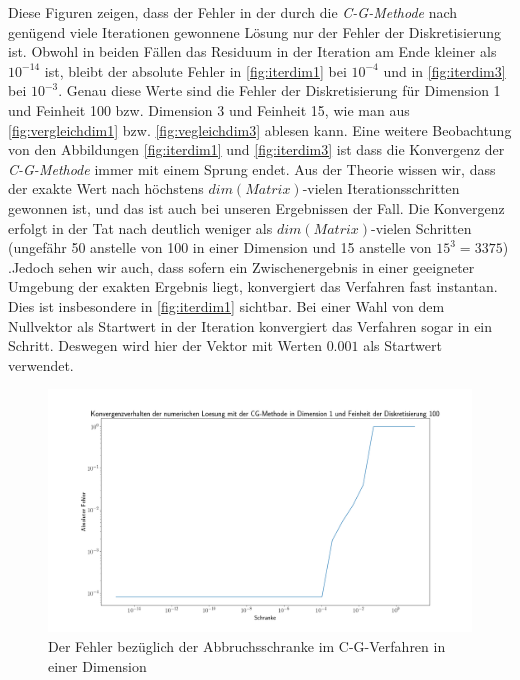 \documentclass[smallheadings]{scrartcl}
\numberwithin{equation}{section}
\begin{document}
 Diese Figuren zeigen, dass der Fehler in der durch die \textit{C-G-Methode} nach genügend viele Iterationen gewonnene Lösung nur der Fehler der Diskretisierung ist. Obwohl in beiden Fällen das Residuum in der Iteration am Ende kleiner als $10^{-14}$ ist, bleibt der absolute Fehler in \ref{fig:iterdim1} bei $10^{-4}$ und in \ref{fig:iterdim3} bei $10^{-3}$. Genau diese Werte sind die Fehler der Diskretisierung für Dimension 1 und Feinheit 100 bzw. Dimension 3 und Feinheit 15, wie man aus \ref{fig:vergleichdim1} bzw. \ref{fig:vegleichdim3} ablesen kann. Eine weitere Beobachtung von den Abbildungen \ref{fig:iterdim1} und \ref{fig:iterdim3} ist dass die Konvergenz der \textit{C-G-Methode} immer mit einem Sprung endet. Aus der Theorie wissen wir, dass der exakte Wert nach höchstens $dim(Matrix)$-vielen Iterationsschritten gewonnen ist, und das ist auch bei unseren Ergebnissen der Fall. Die Konvergenz erfolgt in der Tat nach deutlich weniger als $dim(Matrix)$-vielen Schritten (ungefähr 50 anstelle von 100 in einer Dimension und 15 anstelle von $15^3=3375$) .Jedoch sehen wir auch, dass sofern ein Zwischenergebnis in einer geeigneter Umgebung der exakten Ergebnis liegt, konvergiert das Verfahren fast instantan.  Dies ist insbesondere in \ref{fig:iterdim1} sichtbar. Bei einer Wahl von dem Nullvektor als Startwert in der Iteration konvergiert das Verfahren sogar in ein Schritt. Deswegen wird hier der Vektor mit Werten $0.001$ als Startwert verwendet. 
 
 \begin{figure}[H]
 	\centering
 	\includegraphics[width=\linewidth]{Bilder/SchranekDim1}
 	\caption{Der Fehler bezüglich der Abbruchsschranke im C-G-Verfahren in einer Dimension}
 	\label{fig:schrankedim1}
 \end{figure}
\end{document}
